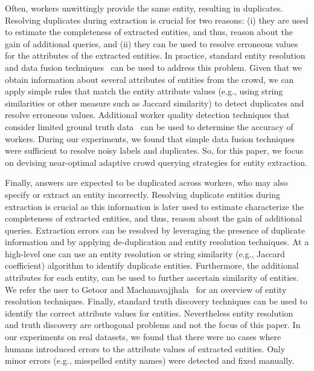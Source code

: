 Often, workers unwittingly provide the same entity, resulting in duplicates. Resolving duplicates during extraction is crucial for two reasons: (i) they are used to estimate the completeness of extracted entities, and thus, reason about the gain of additional queries, and (ii) they can be used to resolve erroneous values for the attributes of the extracted entities. In practice, standard entity resolution and data fusion techniques~\cite{getoor:kdd13} can be used to address this problem. Given that we obtain information about several attributes of entities from the crowd, we can apply simple rules that match the entity attribute values 
\iftr (e.g., using string similarities or other measure such as Jaccard similarity)
\fi 
to detect duplicates and resolve erroneous values. Additional worker quality detection techniques that consider limited ground truth data~\cite{donmez-learning-inference} can be used to determine the accuracy of workers. During our experiments, we found that simple data fusion techniques were sufficient to resolve noisy labels and duplicates. 
So, for this paper, we focus on devising near-optimal adaptive crowd querying strategies for entity extraction. 

\iftr
Finally, answers are expected to be duplicated across workers, who may also specify or extract an entity incorrectly. Resolving duplicate entities during extraction is crucial as this information is later used to estimate characterize the completeness of extracted entities, and thus, reason about the gain of additional queries.  Extraction errors can be resolved by leveraging the presence of duplicate information and by applying de-duplication and entity resolution techniques. At a high-level one can use an entity resolution or string similarity (e.g., Jaccard coefficient) algorithm to identify duplicate entities. Furthermore, the additional attributes for each entity, can be used to further ascertain similarity of entities. We refer the user to Getoor and Machanavajjhala~\cite{getoor:kdd13} for an overview of entity resolution techniques. Finally, standard truth discovery techniques can be used to identify the correct attribute values for entities. Nevertheless entity resolution and truth discovery are orthogonal problems and not the focus of this paper. In our experiments on real datasets, we found that there were no cases where humans introduced errors to the attribute values of extracted entities. Only minor errors (e.g., misspelled entity names) were detected and fixed manually. \fi

